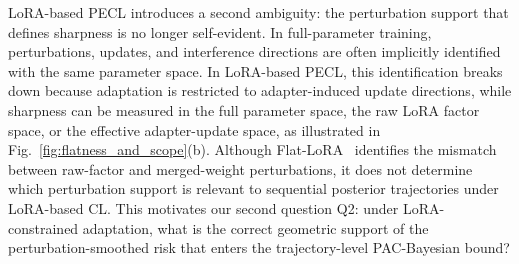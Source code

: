 \documentclass{article}
\begin{document}
LoRA-based PECL introduces a second ambiguity: the perturbation support that defines sharpness is no longer self-evident.
In full-parameter training, perturbations, updates, and interference directions are often implicitly identified with the same parameter space.
In LoRA-based PECL, this identification breaks down because adaptation is restricted to adapter-induced update directions, while sharpness can be measured in the full parameter space, the raw LoRA factor space, or the effective adapter-update space, as illustrated in Fig.~\ref{fig:flatness_and_scope}(b).
Although Flat-LoRA~\cite{li2024flatlora} identifies the mismatch between raw-factor and merged-weight perturbations, it does not determine which perturbation support is relevant to sequential posterior trajectories under LoRA-based CL.
This motivates our second question Q2: under LoRA-constrained adaptation, what is the correct geometric support of the perturbation-smoothed risk that enters the trajectory-level PAC-Bayesian bound?


\end{document}
